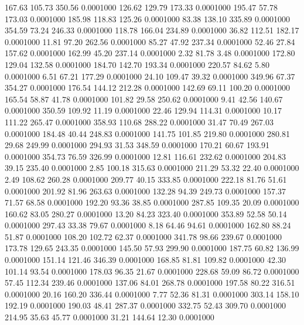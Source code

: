  167.63  105.73  350.56   0.0001000
 126.62  129.79  173.33   0.0001000
 195.47   57.78  173.03   0.0001000
 185.98  118.83  125.26   0.0001000
  83.38  138.10  335.89   0.0001000
 354.59   73.24  246.33   0.0001000
 118.78  166.04  234.89   0.0001000
  36.82  112.51  182.17   0.0001000
  11.81   97.20  262.56   0.0001000
  85.27   47.92  237.34   0.0001000
  52.46   27.84  157.62   0.0001000
 162.99   45.20  237.14   0.0001000
   2.32   81.78    3.48   0.0001000
 172.80  129.04  132.58   0.0001000
 184.70  142.70  193.34   0.0001000
 220.57   84.62    5.80   0.0001000
   6.51   67.21  177.29   0.0001000
  24.10  109.47   39.32   0.0001000
 349.96   67.37  354.27   0.0001000
 176.54  144.12  212.28   0.0001000
 142.69   69.11  100.20   0.0001000
 165.54   58.87   41.78   0.0001000
 101.82   29.58  250.62   0.0001000
   9.41   42.56  140.67   0.0001000
 350.59  109.92   11.19   0.0001000
  22.46  129.94  114.31   0.0001000
  10.17  111.22  265.47   0.0001000
 358.93  110.68  288.22   0.0001000
  31.47   70.49  267.03   0.0001000
 184.48   40.44  248.83   0.0001000
 141.75  101.85  219.80   0.0001000
 280.81   29.68  249.99   0.0001000
 294.93   31.53  348.59   0.0001000
 170.21   60.67  193.91   0.0001000
 354.73   76.59  326.99   0.0001000
  12.81  116.61  232.62   0.0001000
 204.83   39.15  235.40   0.0001000
   2.85  100.18  315.63   0.0001000
 211.29   53.32   22.40   0.0001000
   2.49  108.62  260.28   0.0001000
 209.77   40.15  333.85   0.0001000
 222.18   81.76   51.61   0.0001000
 201.92   81.96  263.63   0.0001000
 132.28   94.39  249.73   0.0001000
 157.37   71.57   68.58   0.0001000
 192.20   93.36   38.85   0.0001000
 287.85  109.35   20.09   0.0001000
 160.62   83.05  280.27   0.0001000
  13.20   84.23  323.40   0.0001000
 353.89   52.58   50.14   0.0001000
 297.43   33.38   79.67   0.0001000
   8.18   64.46   94.61   0.0001000
 162.80   88.24   51.87   0.0001000
 108.20  102.72   62.37   0.0001000
 341.78   98.66  239.67   0.0001000
 173.78  129.65  243.35   0.0001000
 145.50   57.93  299.90   0.0001000
 187.75   60.82  136.99   0.0001000
 151.14  121.46  346.39   0.0001000
 168.85   81.81  109.82   0.0001000
  42.30  101.14   93.54   0.0001000
 178.03   96.35   21.67   0.0001000
 228.68   59.09   86.72   0.0001000
  57.45  112.34  239.46   0.0001000
 137.06   84.01  268.78   0.0001000
 197.58   80.22  316.51   0.0001000
  20.16  160.20  336.44   0.0001000
   7.77   52.36   81.31   0.0001000
 303.14  158.10  192.19   0.0001000
 190.03   48.41  287.37   0.0001000
 332.75   52.43  309.70   0.0001000
 214.95   35.63   45.77   0.0001000
  31.21  144.64   12.30   0.0001000

